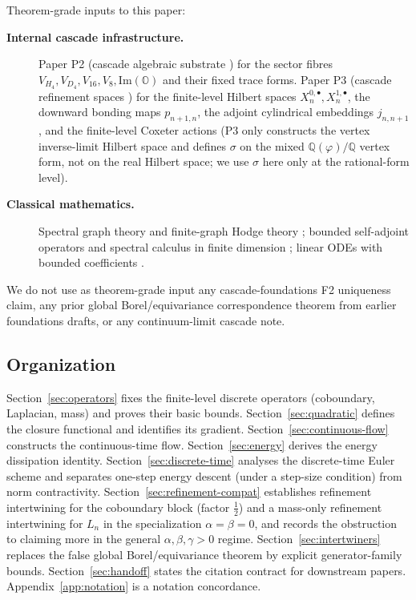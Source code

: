 \documentclass[11pt, a4paper]{amsart}
\theoremstyle{definition}
\newcommand{\Q}{\mathbb{Q}}
\newcommand{\OO}{\mathbb{O}}
\renewcommand{\Im}{\mathrm{Im}}
\begin{document}
Theorem-grade inputs to this paper:
\begin{description}
\item[\textbf{Internal cascade infrastructure.}]
  Paper P2 (cascade algebraic substrate
  \cite{AlgebraicSubstrate}) for the sector fibres $V_{H_4},
  V_{D_4}, V_{16}, V_8, \Im(\OO)$ and their fixed trace forms.
  Paper P3 (cascade refinement spaces
  \cite{RefinementSpaces}) for the finite-level Hilbert spaces
  $X_n^{0, \bullet}, X_n^{1, \bullet}$, the downward bonding
  maps $p_{n+1, n}$, the adjoint cylindrical embeddings
  $j_{n, n+1}$, and the finite-level Coxeter actions
  (P3 only constructs the vertex inverse-limit Hilbert space and
  defines $\sigma$ on the mixed $\Q(\varphi)/\Q$ vertex form,
  not on the real Hilbert space; we use $\sigma$ here only at
  the rational-form level).
\item[\textbf{Classical mathematics.}]
  Spectral graph theory and finite-graph Hodge theory
  \cite{Chung}; bounded self-adjoint operators and spectral
  calculus in finite dimension \cite{ReedSimonI, HornJohnson};
  linear ODEs with bounded coefficients
  \cite{CoddingtonLevinson, Hartman}.
\end{description}

We do not use as theorem-grade input any cascade-foundations F2
uniqueness claim, any prior global Borel/equivariance correspondence
theorem from earlier foundations drafts, or any continuum-limit
cascade note.

\subsection{Organization}

Section~\ref{sec:operators} fixes the finite-level discrete
operators (coboundary, Laplacian, mass) and proves their basic
bounds. Section~\ref{sec:quadratic} defines the closure functional
and identifies its gradient. Section~\ref{sec:continuous-flow}
constructs the continuous-time flow. Section~\ref{sec:energy}
derives the energy dissipation identity.
Section~\ref{sec:discrete-time} analyses the discrete-time Euler
scheme and separates one-step energy descent (under a step-size
condition) from norm contractivity.
Section~\ref{sec:refinement-compat} establishes refinement
intertwining for the coboundary block (factor $\tfrac{1}{2}$)
and a mass-only refinement intertwining for $L_n$ in the
specialization $\alpha = \beta = 0$, and records the obstruction
to claiming more in the general $\alpha, \beta, \gamma > 0$
regime. Section~\ref{sec:intertwiners} replaces the false
global Borel/equivariance theorem by explicit generator-family
bounds. Section~\ref{sec:handoff} states the citation contract for
downstream papers. Appendix~\ref{app:notation} is a notation
concordance.
\end{document}
